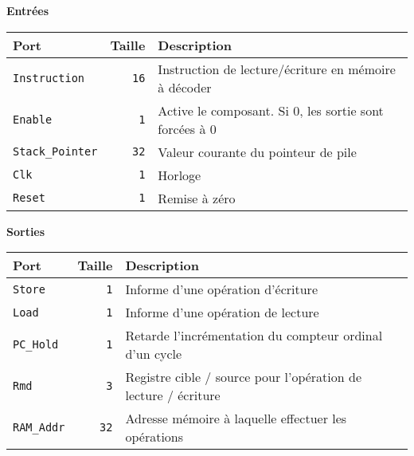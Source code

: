 \documentclass{article}
\begin{document}

    \textbf{Entrées}\\

    \begin{tabular}{|l|r|l|}
        \hline
        \textbf{Port}           & \textbf{Taille} & \textbf{Description}                                 \\
        \hline

        \texttt{Instruction}    & \texttt{16}     & Instruction de lecture/écriture en mémoire à décoder \\
        \hline
        \texttt{Enable} & \texttt{1} & Active le composant.
        Si 0, les sortie sont forcées à 0 \\
        \hline
        \texttt{Stack\_Pointer} & \texttt{32}     & Valeur courante du pointeur de pile                  \\
        \hline
        \texttt{Clk}            & \texttt{1}      & Horloge                                              \\
        \hline
        \texttt{Reset}          & \texttt{1}      & Remise à zéro                                        \\


        \hline
    \end{tabular}

    \vspace{1em}
    \textbf{Sorties}\\

    \begin{tabular}{|l|r|l|}
        \hline
        \textbf{Port}      & \textbf{Taille} & \textbf{Description}                                    \\
        \hline

        \texttt{Store}     & \texttt{1}      & Informe d'une opération d'écriture                      \\
        \hline
        \texttt{Load}      & \texttt{1}      & Informe d'une opération de lecture                      \\
        \hline
        \texttt{PC\_Hold}  & \texttt{1}      & Retarde l'incrémentation du compteur ordinal d'un cycle \\
        \hline
        \texttt{Rmd}       & \texttt{3}      & Registre cible / source pour l'opération de lecture / écriture \\
        \hline
        \texttt{RAM\_Addr} & \texttt{32}     & Adresse mémoire à laquelle effectuer les opérations     \\
        \hline
    \end{tabular}
\end{document}
